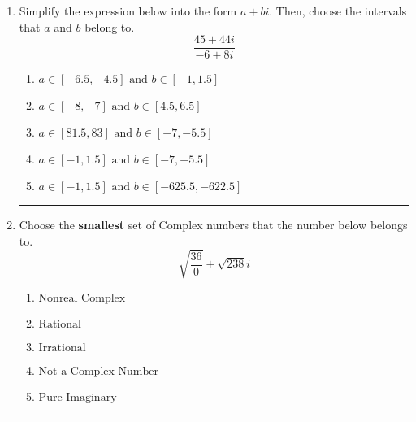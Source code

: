 \documentclass[14pt]{extbook}
\newcommand{\litem}[1]{\item#1\hspace*{-1cm}\rule{\textwidth}{0.4pt}}
\begin{document}
\begin{enumerate}
{\begin{enumerate}[label=\Alph*.]
\end{enumerate} }
\litem{
Simplify the expression below into the form $a+bi$. Then, choose the intervals that $a$ and $b$ belong to.\[ \frac{45 + 44 i}{-6 + 8 i} \]\begin{enumerate}[label=\Alph*.]
\item \( a \in [-6.5, -4.5] \text{ and } b \in [-1, 1.5] \)
\item \( a \in [-8, -7] \text{ and } b \in [4.5, 6.5] \)
\item \( a \in [81.5, 83] \text{ and } b \in [-7, -5.5] \)
\item \( a \in [-1, 1.5] \text{ and } b \in [-7, -5.5] \)
\item \( a \in [-1, 1.5] \text{ and } b \in [-625.5, -622.5] \)

\end{enumerate} }
\litem{
Choose the \textbf{smallest} set of Complex numbers that the number below belongs to.\[ \sqrt{\frac{36}{0}}+\sqrt{238} i \]\begin{enumerate}[label=\Alph*.]
\item \( \text{Nonreal Complex} \)
\item \( \text{Rational} \)
\item \( \text{Irrational} \)
\item \( \text{Not a Complex Number} \)
\item \( \text{Pure Imaginary} \)

\end{enumerate} }
\end{enumerate}
\end{document}
